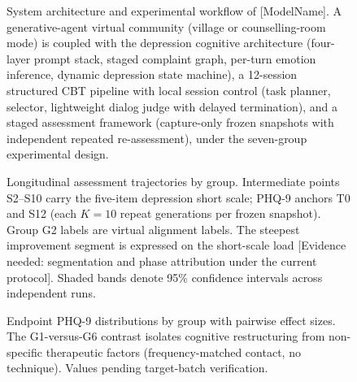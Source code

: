 \documentclass[sn-nature,pdflatex]{sn-jnl}
\begin{document}
\begin{figure}[h]
\centering
\caption{System architecture and experimental workflow of [ModelName]. A generative-agent virtual community (village or counselling-room mode) is coupled with the depression cognitive architecture (four-layer prompt stack, staged complaint graph, per-turn emotion inference, dynamic depression state machine), a 12-session structured CBT pipeline with local session control (task planner, selector, lightweight dialog judge with delayed termination), and a staged assessment framework (capture-only frozen snapshots with independent repeated re-assessment), under the seven-group experimental design.}
\label{fig:architecture}
\end{figure}

\begin{figure}[h]
\centering
\caption{Longitudinal assessment trajectories by group. Intermediate points S2--S10 carry the five-item depression short scale; PHQ-9 anchors T0 and S12 (each $K=10$ repeat generations per frozen snapshot). Group G2 labels are virtual alignment labels. The steepest improvement segment is expressed on the short-scale load [Evidence needed: segmentation and phase attribution under the current protocol]. Shaded bands denote 95\% confidence intervals across independent runs.}
\label{fig:trajectories}
\end{figure}

\begin{figure}[h]
\centering
\caption{Endpoint PHQ-9 distributions by group with pairwise effect sizes. The G1-versus-G6 contrast isolates cognitive restructuring from non-specific therapeutic factors (frequency-matched contact, no technique). Values pending target-batch verification.}
\label{fig:endpoints}
\end{figure}
\end{document}
